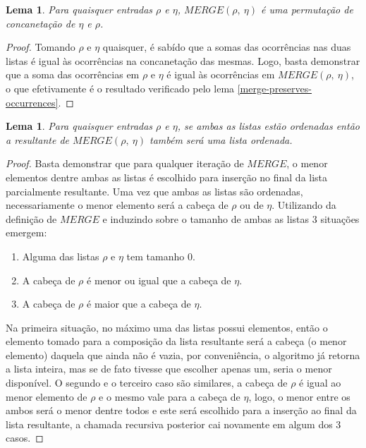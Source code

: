 \documentclass[12pt]{article}
\newtheorem{lemma}[theorem]{Lema}
\theoremstyle{definition}
\begin{document}
\begin{lemma}
\label{merge-is-permutation}
        Para quaisquer entradas $\rho$ e $\eta$, $MERGE(\rho,\ \eta)$ é uma permutação de concanetação de $\eta$ e $\rho$.
\end{lemma}
\begin{proof}
        Tomando $\rho$ e $\eta$ quaisquer, é sabído que a somas das ocorrências nas duas listas é igual às ocorrências
        na concanetação das mesmas. Logo, basta demonstrar que a soma das ocorrências em $\rho$ e $\eta$ é igual às
        ocorrências em $MERGE(\rho,\ \eta)$, o que efetivamente é o resultado verificado pelo lema \ref{merge-preserves-occurrences}. 
\end{proof}

\begin{lemma}
\label{merge-of-sorted-is-sorted}
        Para quaisquer entradas $\rho$ e $\eta$, se ambas as listas estão ordenadas então
        a resultante de $MERGE(\rho,\ \eta)$ também será uma lista ordenada. 
\end{lemma}

\begin{proof}
        Basta demonstrar que para qualquer iteração de $MERGE$, o menor elementos dentre ambas as listas é escolhido para inserção no final
        da lista parcialmente resultante. Uma vez que ambas as listas são ordenadas, necessariamente o menor elemento será a cabeça de $\rho$ ou de $\eta$.
        Utilizando da definição de $MERGE$ e induzindo sobre o tamanho de ambas as listas 3 situações emergem:
        \begin{enumerate}
                \item Alguma das listas $\rho$ e $\eta$ tem tamanho 0.
                \item A cabeça de $\rho$ é menor ou igual que a cabeça de $\eta$.
                \item A cabeça de $\rho$ é maior que a cabeça de $\eta$.
        \end{enumerate}

        Na primeira situação, no máximo uma das listas possui elementos, então o elemento tomado para a composição da lista resultante será a cabeça
        (o menor elemento) daquela que ainda não é vazia, por conveniência, o algoritmo já retorna a lista inteira, mas se de fato tivesse que escolher apenas
        um, seria o menor disponível. O segundo e o terceiro caso são similares, a cabeça de $\rho$ é igual ao menor elemento de $\rho$ e o mesmo vale para a cabeça
        de $\eta$, logo, o menor entre os ambos será o menor dentre todos e este será escolhido para a inserção ao final da lista resultante, a chamada recursiva 
        posterior cai novamente em algum dos 3 casos.

\end{proof}
\end{document}

